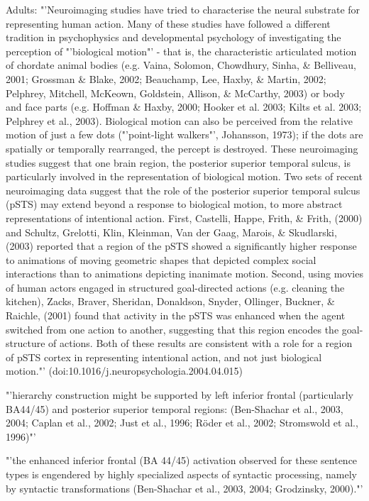 Adults:
"'Neuroimaging studies have tried to characterise the neural substrate for representing human action. Many of these studies have followed a different tradition in psychophysics and developmental psychology of investigating the perception of "'biological motion"' - that is, the characteristic articulated motion of chordate animal bodies (e.g. Vaina, Solomon, Chowdhury, Sinha, \& Belliveau, 2001; Grossman \& Blake, 2002; Beauchamp, Lee, Haxby, \& Martin, 2002; Pelphrey, Mitchell, McKeown, Goldstein, Allison, \& McCarthy, 2003) or body and face parts (e.g. Hoffman \& Haxby, 2000; Hooker et al. 2003; Kilts et al. 2003; Pelphrey et al., 2003). Biological motion can also be perceived from the relative motion of just a few dots ("'point-light walkers"', Johansson, 1973); if the dots are spatially or temporally rearranged, the percept is destroyed. These neuroimaging studies suggest that one brain region, the posterior superior temporal sulcus, is particularly involved in the representation of biological motion.
Two sets of recent neuroimaging data suggest that the role of the posterior superior temporal sulcus (pSTS) may extend beyond a response to biological motion, to more abstract representations of intentional action. First, Castelli, Happe, Frith, \& Frith, (2000) and Schultz, Grelotti, Klin, Kleinman, Van der Gaag, Marois, \& Skudlarski, (2003) reported that a region of the pSTS showed a significantly higher response to animations of moving geometric shapes that depicted complex social interactions than to animations depicting inanimate motion. Second, using movies of human actors engaged in structured goal-directed actions (e.g. cleaning the kitchen), Zacks, Braver, Sheridan, Donaldson, Snyder, Ollinger, Buckner, \& Raichle, (2001) found that activity in the pSTS was enhanced when the agent switched from one action to another, suggesting that this region encodes the goal-structure of actions. Both of these results are consistent with a role for a region of pSTS cortex in representing intentional action, and not just biological motion."' (doi:10.1016/j.neuropsychologia.2004.04.015)


"'hierarchy construction might be supported by left inferior frontal (particularly BA44/45) and posterior superior temporal regions: (Ben-Shachar et al., 2003, 2004; Caplan et al., 2002; Just et al., 1996; Röder et al., 2002; Stromswold et al., 1996)"'

"'the enhanced inferior frontal (BA 44/45) activation observed for these sentence types is engendered by highly specialized aspects of syntactic processing, namely by syntactic transformations (Ben-Shachar et al., 2003, 2004; Grodzinsky, 2000)."'

